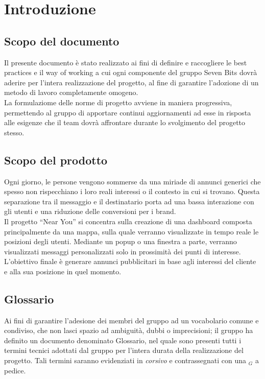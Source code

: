 \section{Introduzione}
    \subsection{Scopo del documento}
    Il presente documento è stato realizzato ai fini di definire e raccogliere le best practices e il way of working a cui ogni componente del gruppo Seven Bits dovrà aderire per l'intera realizzazione del progetto, al fine di garantire l'adozione di un metodo di lavoro completamente omogeno.\\
    La formulaziome delle norme di progetto avviene in maniera progressiva, permettendo al gruppo di apportare continui aggiornamenti ad esse in risposta alle esigenze che il team dovrà affrontare durante lo svolgimento del progetto stesso.\\ 

    \subsection{Scopo del prodotto}
    Ogni giorno, le persone vengono sommerse da una miriade di annunci generici che spesso non rispecchiano i loro reali interessi o il contesto in cui si trovano. Questa separazione tra il messaggio e il destinatario porta ad una bassa interazione con gli utenti e una riduzione delle conversioni per i brand.\\
    Il progetto “Near You” si concentra sulla creazione di una dashboard composta principalmente da una mappa, sulla quale verranno visualizzate in tempo reale le posizioni degli utenti. Mediante un popup o una finestra a parte, verranno visualizzati messaggi personalizzati solo in prossimità dei punti di interesse.\\
    L'obiettivo finale è generare annunci pubblicitari in base agli interessi del cliente e alla sua posizione in quel momento.\\
    
    \subsection{Glossario}
    Ai fini di garantire l'adesione dei membri del gruppo ad un vocabolario comune e condiviso, che non lasci spazio ad ambiguità, dubbi o imprecisioni; il gruppo ha definito un documento denominato Glossario, nel quale sono presenti tutti i termini tecnici adottati dal gruppo per l'intera durata della realizzazione del progetto. Tali termini saranno evidenziati in \textit{corsivo} e contrassegnati con una $_G$ a pedice.

